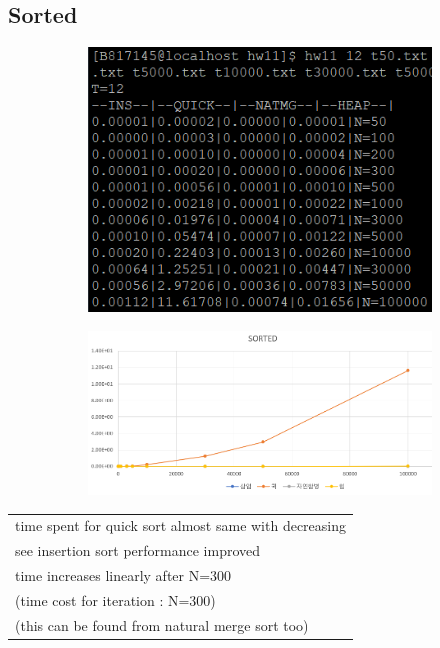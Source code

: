 \documentclass{article}
\begin{document}
\subsection{Sorted}
\begin{figure}[H]
\begin{subfigure}[ht]{.3\linewidth}\centering
\includegraphics[width=.9\linewidth]{sorted2.PNG}
\end{subfigure}
\begin{subfigure}[ht]{.7\linewidth}\centering
\includegraphics[width=.9\linewidth]{sorted.PNG}
\end{subfigure}
\end{figure}
\begin{table}[H]
\centering
\begin{tabular}{|m{15cm}|}
\hline
time spent for quick sort almost same with decreasing\\
see insertion sort performance improved\\
time increases linearly after N=300\\
(time cost for iteration : N=300)\\
(this can be found from natural merge sort too)\\
\hline
\end{tabular}
\end{table}
\end{document}
